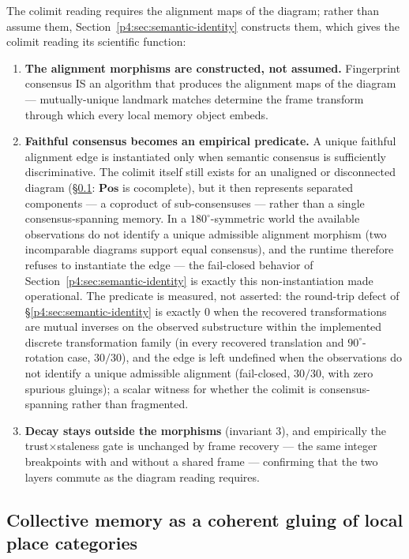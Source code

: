 \documentclass{article}
\begin{document}
The colimit reading requires the alignment maps of the diagram; rather
than assume them, Section~\ref{p4:sec:semantic-identity} constructs them,
which gives the colimit reading its scientific function:
\begin{enumerate}[leftmargin=20pt,itemsep=2pt,topsep=2pt]
\item \textbf{The alignment morphisms are constructed, not assumed.}
  Fingerprint consensus IS an algorithm that produces the alignment
  maps of the diagram --- mutually-unique landmark matches determine
  the frame transform through which every local memory object embeds.
\item \textbf{Faithful consensus becomes an empirical predicate.} A
  unique faithful alignment edge is instantiated only when semantic
  consensus is sufficiently discriminative. The colimit itself still
  exists for an unaligned or disconnected diagram (\S\ref{p4:sec:gluing}:
  $\mathbf{Pos}$ is cocomplete), but it then represents separated
  components --- a coproduct of sub-consensuses --- rather than a single
  consensus-spanning memory. In a $180^\circ$-symmetric world the
  available observations do not identify a unique admissible alignment
  morphism (two incomparable diagrams support equal consensus), and the
  runtime therefore refuses to instantiate the edge --- the fail-closed
  behavior of Section~\ref{p4:sec:semantic-identity} is exactly this
  non-instantiation made operational. The predicate is measured, not
  asserted: the round-trip defect of
  \S\ref{p4:sec:semantic-identity} is exactly $0$ when the recovered
  transformations are mutual inverses on the observed substructure
  within the implemented discrete transformation family (in every
  recovered translation and $90^\circ$-rotation case, $30/30$), and the
  edge is left undefined when the observations do not identify a unique
  admissible alignment (fail-closed, $30/30$, with zero spurious
  gluings); a scalar witness for whether the colimit is
  consensus-spanning rather than fragmented.
\item \textbf{Decay stays outside the morphisms} (invariant 3), and
  empirically the trust$\times$staleness gate is unchanged by frame
  recovery --- the same integer breakpoints with and without a shared
  frame --- confirming that the two layers commute as the diagram
  reading requires.
\end{enumerate}

\subsection{Collective memory as a coherent gluing of local place categories}
\label{p4:sec:gluing}
\end{document}
